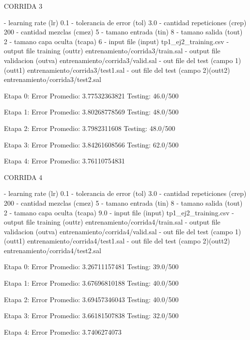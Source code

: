 CORRIDA 3

  - learning rate              (lr)         0.1
  - tolerancia de error        (tol)        3.0
  - cantidad repeticiones      (crep)       200
  - cantidad mezclas           (cmez)       5
  - tamano entrada             (tin)        8
  - tamano salida              (tout)       2
  - tamano capa oculta         (tcapa)      6
  - input file                 (input)      tp1_ej2_training.csv
  - output file training       (outtr)      entrenamiento/corrida3/train.sal
  - output file validacion     (outva)      entrenamiento/corrida3/valid.sal
  - out file del test (campo 1)(outt1)      entrenamiento/corrida3/test1.sal
  - out file del test (campo 2)(outt2)      entrenamiento/corrida3/test2.sal


Etapa 0:
      Error Promedio: 3.77532363821
      Testing: 46.0/500

Etapa 1:
      Error Promedio: 3.80268778569
      Testing: 48.0/500

Etapa 2:
      Error Promedio: 3.7982311608
      Testing: 48.0/500

Etapa 3:
      Error Promedio: 3.84261608566
      Testing: 62.0/500

Etapa 4:
      Error Promedio: 3.76110754831



CORRIDA 4

  - learning rate              (lr)         0.1
  - tolerancia de error        (tol)        3.0
  - cantidad repeticiones      (crep)       200
  - cantidad mezclas           (cmez)       5
  - tamano entrada             (tin)        8
  - tamano salida              (tout)       2
  - tamano capa oculta         (tcapa)      9.0
  - input file                 (input)      tp1_ej2_training.csv
  - output file training       (outtr)      entrenamiento/corrida4/train.sal
  - output file validacion     (outva)      entrenamiento/corrida4/valid.sal
  - out file del test (campo 1)(outt1)      entrenamiento/corrida4/test1.sal
  - out file del test (campo 2)(outt2)      entrenamiento/corrida4/test2.sal

Etapa 0:
      Error Promedio: 3.26711157481
      Testing: 39.0/500

Etapa 1:
      Error Promedio: 3.67696810188
      Testing: 40.0/500

Etapa 2:
      Error Promedio: 3.69457346043
      Testing: 40.0/500

Etapa 3:
      Error Promedio: 3.66181507838
      Testing: 32.0/500

Etapa 4:
      Error Promedio: 3.7406274073



